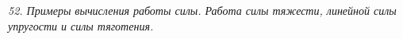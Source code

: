 \emph{52. Примеры вычисления работы силы. Работа силы тяжести, линейной силы
упругости и силы тяготения.}

\newpage
